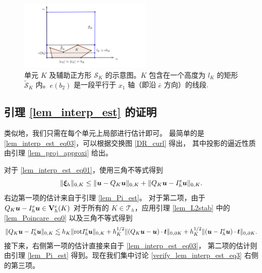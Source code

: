 \begin{figure}[h]
\centering
\includegraphics[width=2.5in]{./figures/maxwell/block4}
\caption{单元 $K$ 及辅助正方形 $\mathcal{S}_K$ 的示意图。$K$ 包含在一个高度为
$l_K$ 的矩形 $\widetilde{\mathcal{S}}_K$ 内。$e(b_2)$ 是一段平行于 $x_1$
轴（即沿 $\bar{e}$ 方向）的线段.}
\label{fig:block}
\end{figure}

\subsection{引理 \ref{lem_interp_est} 的证明}
类似地，我们只需在每个单元上局部进行估计即可。
最简单的是 \eqref{lem_interp_est_eq03}，可以根据交换图 \eqref{DR_curl} 得出，
其中投影的逼近性质由引理 \ref{lem_proj_approxi} 给出。

对于 \eqref{lem_interp_est_eq01}，使用三角不等式得到
\begin{equation}
\label{verify_lem_interp_est_eq2}
\| \boldsymbol{\xi}_h  \|_{0,K} \le \| \boldsymbol{u} - Q_K \boldsymbol{u} \|_{0,K} + \| Q_K \boldsymbol{u} - I^e_h \boldsymbol{u} \|_{0,K}.
\end{equation}
右边第一项的估计来自于引理 \ref{lem_Pi_est}。
对于第二项，由于 $Q_K \boldsymbol{u} - I^e_h \boldsymbol{u} \in \mathbf{V}^e_h(K)$ 对于所有的 $K \in \mathcal{T}_h$，应用引理 \ref{lem_L2stab} 中的 \eqref{lem_Poincare_eq0} 以及三角不等式得到
\begin{equation}
\begin{split}
\label{verify_lem_interp_est_eq3}
\| Q_K \bu - I^e_h \bu \|_{0,K} %
\lesssim h_K \| \rot I^e_h \bu \|_{0,K} +  h^{1/2}_K \|  (Q_K \bu - \bu)\cdot\bt \|_{0,\partial K} +  h^{1/2}_K \|  ( \bu - I^e_h \bu)\cdot\bt \|_{0,\partial K}.
\end{split}
\end{equation}
接下来，右侧第一项的估计直接来自于 \eqref{lem_interp_est_eq03}，
第二项的估计则由引理 \ref{lem_Pi_est} 得到。现在我们集中讨论 \eqref{verify_lem_interp_est_eq3} 右侧的第三项。

